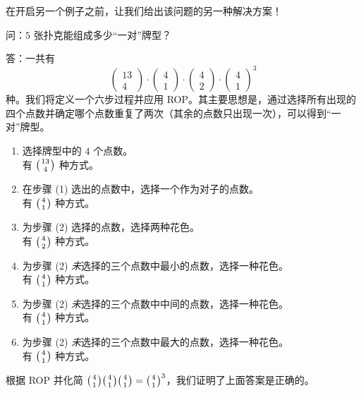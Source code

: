\begin{example}[一对]
    在开启另一个例子之前，让我们给出该问题的另一种解决方案！

    \begin{questions}{问}：$5$ 张扑克能组成多少``一对''牌型？\end{questions}

    \begin{proofs}{答}：一共有
        \[\begin{pmatrix}
                13 \\
                4
            \end{pmatrix} \cdot \begin{pmatrix}
                4 \\
                1
            \end{pmatrix} \cdot \begin{pmatrix}
                4 \\
                2
            \end{pmatrix} \cdot \begin{pmatrix}
                4 \\
                1
            \end{pmatrix}^3\]
        种。我们将定义一个六步过程并应用 ROP。其主要思想是，通过选择所有出现的四个点数并确定哪个点数重复了两次（其余的点数只出现一次），可以得到``一对''牌型。
        \begin{enumerate}[label=(\arabic*)]
            \item 选择牌型中的 $4$ 个点数。\\
                  有 $\big({13 \atop 4}\big)$ 种方式。
            \item 在步骤 (1) 选出的点数中，选择一个作为对子的点数。\\
                  有 $\big({4 \atop 1}\big)$ 种方式。
            \item 为步骤 (2) 选择的点数，选择两种花色。\\
                  有 $\big({4 \atop 2}\big)$ 种方式。
            \item 为步骤 (2) \emph{未}选择的三个点数中最小的点数，选择一种花色。\\
                  有 $\big({4 \atop 1}\big)$ 种方式。
            \item 为步骤 (2) \emph{未}选择的三个点数中中间的点数，选择一种花色。\\
                  有 $\big({4 \atop 1}\big)$ 种方式。
            \item 为步骤 (2) \emph{未}选择的三个点数中最大的点数，选择一种花色。\\
                  有 $\big({4 \atop 1}\big)$ 种方式。
        \end{enumerate}
        根据 ROP 并化简 $\big({4 \atop 1}\big)\big({4 \atop 1}\big)\big({4 \atop 1}\big)=\big({4 \atop 1}\big)^3$，我们证明了上面答案是正确的。
    \end{proofs}


\end{example}
